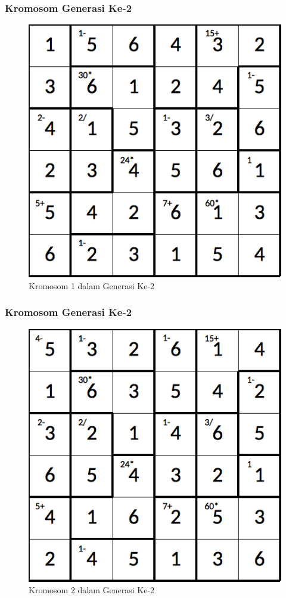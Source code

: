 \documentclass{beamer}
\begin{document}
\begin{frame}
\frametitle{Kromosom Generasi Ke-2}
\begin{figure}
\centering
\captionsetup{justification=centering}
\includegraphics[scale=0.333]{Gambar/hybridgenetic/Generation2Chromosome1}
\caption[Kromosom 1 dalam Generasi Ke-2]{Kromosom 1 dalam Generasi Ke-2}
\label{fig:analisisg2k1}
\end{figure}
\end{frame}

\note{

}

\begin{frame}
\frametitle{Kromosom Generasi Ke-2}
\begin{figure}
\centering
\captionsetup{justification=centering}
\includegraphics[scale=0.333]{Gambar/hybridgenetic/Generation2Chromosome2}
\caption[Kromosom 2 dalam Generasi Ke-2]{Kromosom 2 dalam Generasi Ke-2}
\label{fig:analisisg2k2}
\end{figure}
\end{frame}
\end{document}
